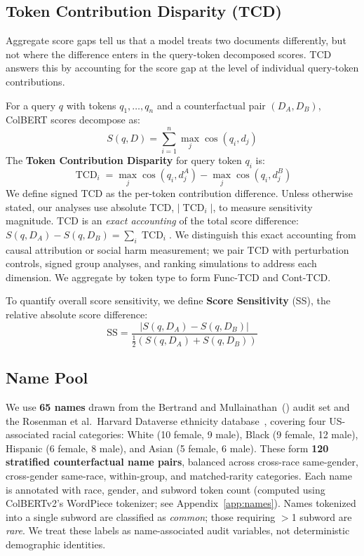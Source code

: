 \documentclass[11pt]{article}
\newcommand{\tcd}{\operatorname{TCD}}
\begin{document}
\subsection{Token Contribution Disparity (TCD)}

Aggregate score gaps tell us that a model treats two documents differently, but not where the difference enters in the query-token decomposed scores. TCD answers this by accounting for the score gap at the level of individual query-token contributions.

For a query $q$ with tokens $q_1, \dots, q_n$ and a counterfactual pair $(D_A, D_B)$, ColBERT scores decompose as:
\begin{equation}
S(q, D) = \sum_{i=1}^{n} \max_{j} \cos(q_i, d_j)
\end{equation}
The \textbf{Token Contribution Disparity} for query token $q_i$ is:
\begin{equation}
\tcd_i = \max_{j} \cos(q_i, d^A_j) - \max_{j} \cos(q_i, d^B_j)
\label{eq:tcd}
\end{equation}
We define signed TCD as the per-token contribution difference. Unless otherwise stated, our analyses use absolute TCD, $|\tcd_i|$, to measure sensitivity magnitude. TCD is an \emph{exact accounting} of the total score difference: $S(q, D_A) - S(q, D_B) = \sum_i \tcd_i$. We distinguish this exact accounting from causal attribution or social harm measurement; we pair TCD with perturbation controls, signed group analyses, and ranking simulations to address each dimension. We aggregate by token type to form Func-TCD and Cont-TCD.

To quantify overall score sensitivity, we define \textbf{Score Sensitivity} (SS), the relative absolute score difference:
\begin{equation}
\text{SS} = \frac{|S(q,D_A) - S(q,D_B)|}{\tfrac{1}{2}(S(q,D_A) + S(q,D_B))}
\label{eq:ss}
\end{equation}

\subsection{Name Pool}
\label{sec:method:names}

We use \textbf{65 names} drawn from the Bertrand and Mullainathan~(\citeyear{bertrand2004}) audit set and the Rosenman et al.\ Harvard Dataverse ethnicity database~\citep{rosenman2023}, covering four US-associated racial categories: White (10 female, 9 male), Black (9 female, 12 male), Hispanic (6 female, 8 male), and Asian (5 female, 6 male). These form \textbf{120 stratified counterfactual name pairs}, balanced across cross-race same-gender, cross-gender same-race, within-group, and matched-rarity categories. Each name is annotated with race, gender, and subword token count (computed using ColBERTv2's WordPiece tokenizer; see Appendix~\ref{app:names}). Names tokenized into a single subword are classified as \emph{common}; those requiring $>$1 subword are \emph{rare}. We treat these labels as name-associated audit variables, not deterministic demographic identities.
\end{document}
